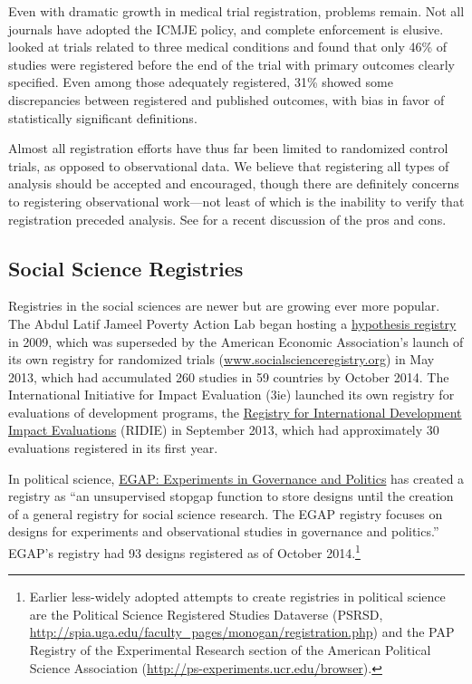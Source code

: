 \documentclass[12pt] {article}
\begin{document}
Even with dramatic growth in medical trial registration, problems
remain. Not all journals have adopted the ICMJE policy, and complete
enforcement is elusive. \cite{mathieu_s_comparison_2009} looked at trials related
to three medical conditions and found that only 46\% of studies were
registered before the end of the trial with primary outcomes clearly
specified. Even among those adequately registered, 31\% showed some
discrepancies between registered and published outcomes, with bias in
favor of statistically significant definitions.

Almost all registration efforts have thus far been limited to randomized
control trials, as opposed to observational data. We believe
that registering all types of analysis should be accepted and encouraged, though there are definitely concerns to registering observational work---not least of which is the inability to verify that registration preceded analysis. See \cite{dal-re_making_2014} for a recent discussion of the pros and cons.
 
\subsection{Social Science Registries}\label{social-science-registries}

Registries in the social sciences are newer but are growing ever more
popular. The Abdul Latif Jameel Poverty Action Lab began hosting a
\href{http://www.povertyactionlab.org/hypothesis-registry}{hypothesis registry}
 in 2009, which was superseded by the American Economic Association's launch of
its own registry for randomized trials
(\href{http://www.socialscienceregistry.org}{www.socialscienceregistry.org})
in May 2013, which had accumulated 260 studies in 59 countries by
October 2014. The International Initiative for Impact Evaluation (3ie)
launched its own registry for evaluations of development programs, the
\href{http://ridie.3ieimpact.org}{Registry for International Development Impact Evaluations} (RIDIE) in September 2013, which had
approximately 30 evaluations registered in its first year.

In political science, \href{http://e-gap.org/design-registration}{EGAP: Experiments in Governance and Politics} has
created a registry as ``an unsupervised stopgap function to store
designs until the creation of a general registry for social science
research. The EGAP registry focuses on designs for experiments and
observational studies in governance and politics.'' EGAP's registry had 93
designs registered as of October 2014.\footnote{Earlier less-widely
  adopted attempts to create registries in political science are the
  Political Science Registered Studies Dataverse (PSRSD,
  \href{../customXml/item1.xml}{http://spia.uga.edu/faculty\_pages/monogan/registration.php})
  and the PAP Registry of the Experimental Research section of the
  American Political Science Association
  (\href{numbering.xml}{http://ps-experiments.ucr.edu/browser}).}
\end{document}
